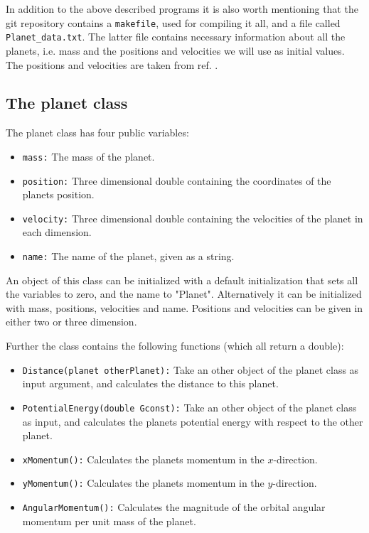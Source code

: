 \documentclass[12pt, a4paper]{article}
\begin{document}
In addition to the above described programs it is also worth mentioning that the git repository contains 
a \texttt{makefile}, used for compiling it all, and a file called \texttt{Planet\_data.txt}. The latter 
file contains necessary information about all the planets, i.e. mass and the positions and velocities 
we will use as initial values. The positions and velocities are taken from ref. \cite{NASA}.  

\subsection{The planet class}

The planet class has four public variables: 
\begin{itemize}
\item \texttt{mass:} The mass of the planet. 
\item \texttt{position:} Three dimensional double containing the coordinates of the planets position.
\item \texttt{velocity:} Three dimensional double containing the velocities of the planet in each 
dimension.
\item \texttt{name:} The name of the planet, given as a string.  
\end{itemize}
An object of this class can be initialized with a default initialization that sets all the variables to 
zero, and the name to "Planet". Alternatively it can be initialized with mass, positions, velocities and 
name. Positions and velocities can be given in either two or three dimension. 

Further the class contains the following functions (which all return a double): 
\begin{itemize}
\item \texttt{Distance(planet otherPlanet):} Take an other object of the planet class as input argument, 
and calculates the distance to this planet. 
\item \texttt{PotentialEnergy(double Gconst):} Take an other object of the planet class as input, and 
calculates the planets potential energy with respect to the other planet.   
\item \texttt{xMomentum():} Calculates the planets momentum in the $x$-direction. 
\item \texttt{yMomentum():} Calculates the planets momentum in the $y$-direction. 
\item \texttt{AngularMomentum():} Calculates the magnitude of the orbital angular momentum per unit 
mass of the planet. 
\end{itemize}
\end{document}
